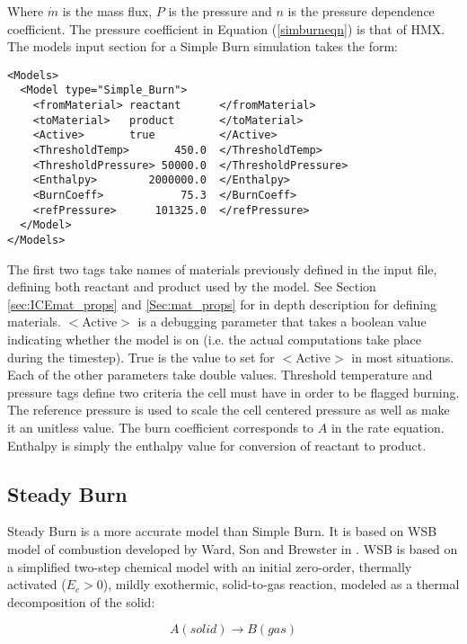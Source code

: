 Where $\dot{m}$ is the mass flux, $P$ is the pressure and $n$ is the pressure dependence coefficient.  The pressure coefficient in Equation (\ref{simburneqn}) is that of HMX.  The models input section for a Simple Burn simulation takes the form: 

\begin{verbatim}
<Models>
  <Model type="Simple_Burn">
    <fromMaterial> reactant      </fromMaterial>
    <toMaterial>   product       </toMaterial>
    <Active>       true          </Active>
    <ThresholdTemp>       450.0  </ThresholdTemp>
    <ThresholdPressure> 50000.0  </ThresholdPressure>
    <Enthalpy>        2000000.0  </Enthalpy>
    <BurnCoeff>            75.3  </BurnCoeff>
    <refPressure>      101325.0  </refPressure>
  </Model>
</Models>
\end{verbatim}

The first two tags take names of materials previously defined in the input file, defining both reactant and product used by the model.  See Section \ref{sec:ICEmat_props} and \ref{Sec:mat_props} for in depth description for defining materials.  $<$Active$>$ is a debugging parameter that takes a boolean value indicating whether the model is on (i.e. the actual computations take place during the timestep).  True is the value to set for $<$Active$>$ in most situations.  Each of the other parameters take double values.  Threshold temperature and pressure tags define two criteria the cell must have in order to be flagged burning.  The reference pressure is used to scale the cell centered pressure as well as make it an unitless value.  The burn coefficient corresponds to $A$ in the rate equation.  Enthalpy is simply the enthalpy value for conversion of reactant to product.
\newpage
\subsection{Steady Burn} \label{Sec:SteadyBurn}

Steady Burn is a more accurate model than Simple Burn.  It is based on WSB model of combustion developed by Ward, Son and Brewster in \cite{ref:wardsonbrewster}.  WSB is based on a simplified two-step chemical model with an initial zero-order, thermally activated ($E_c > 0$), mildly exothermic, solid-to-gas reaction, modeled as a thermal decomposition of the solid:

\begin{equation}
A(solid)\rightarrow B(gas)
\end{equation}

